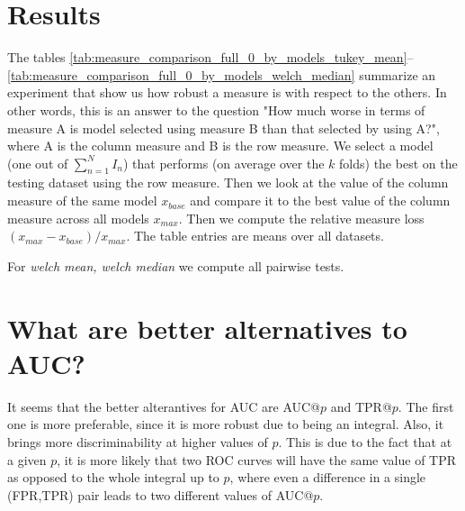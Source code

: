 \documentclass[a4paper]{article}
\begin{document}
\section{Results}
The tables \ref{tab:measure_comparison_full_0_by_models_tukey_mean}--\ref{tab:measure_comparison_full_0_by_models_welch_median} summarize an experiment that show us how robust a measure is with respect to the others. In other words, this is an answer to the question "How much worse in terms of measure A is model selected using measure B than that selected by using A?", where A is the column measure and B is the row measure. We select a model (one out of $\sum_{n=1}^N I_n$) that performs (on average over the $k$ folds) the best on the testing dataset using the row measure. Then we look at the value of the column measure of the same model $x_{base}$ and compare it to the best value of the column measure across all models $x_{max}$. Then we compute the relative measure loss $(x_{max}-x_{base})/x_{max}$.  The table entries are means over all datasets.

For \emph{welch mean, welch median} we compute all pairwise tests.







\section{What are better alternatives to AUC?}
It seems that the better alterantives for AUC are AUC@$p$ and TPR@$p$. The first one is more preferable, since it is more robust due to being an integral. Also, it brings more discriminability at higher values of $p$. This is due to the fact that at a given $p$, it is more likely that two ROC curves will have the same value of TPR as opposed to the whole integral up to $p$, where even a difference in a single (FPR,TPR) pair leads to two different values of AUC@$p$.



\end{document}
